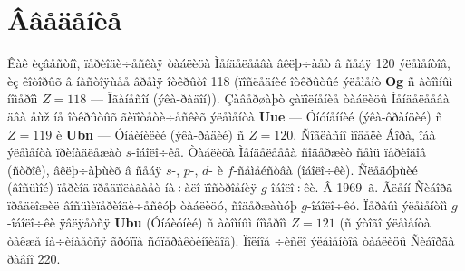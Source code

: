 
\section{Ââåäåíèå}
Êàê èçâåñòíî, ïåðèîäè÷åñêàÿ òàáëèöà Ìåíäåëååâà âêëþ÷àåò â ñåáÿ 120 ýëåìåíòîâ, èç êîòîðûõ â íàñòîÿùåå âðåìÿ îòêðûòî 118 (ïîñëåäíèé îòêðûòûé ýëåìåíò \textbf{Og} ñ àòîìíûì íîìåðîì $Z=118$ --- Îãàíåñîí (ýêà-ðàäîí)). Çàâåðøàþò çàïîëíåíèå òàáëèöû Ìåíäåëååâà äâà åùž íå îòêðûòûõ ãèïîòåòè÷åñêèõ ýëåìåíòà \textbf{Uue} --- Óíóíåííèé (ýêà-ôðàíöèé) ñ $Z=119$ è \textbf{Ubn} --- Óíáèíèëèé (ýêà-ðàäèé) ñ $Z=120$. Ñîãëàñíî ìîäåëè Áîðà, îáà ýëåìåíòà ïðèíàäëåæàò $s$-îáîëî÷êå. Òàáëèöà Ìåíäåëååâà ñîäåðæèò ñåìü ïåðèîäîâ (ñòðîê), âêëþ÷àþùèõ â ñåáÿ $s$-, $p$-, $d$- è $f$-ñåìåéñòâà (îáîëî÷êè). Ñëåäóþùèé (âîñüìîé) ïåðèîä ïðåäïîëàãàåò íà÷àëî ïîñòðîåíèÿ $g$-îáîëî÷êè. Â 1969~ã. Ãëåíí Ñèáîðã \cite{Sea69} ïðåäëîæèë âîñüìèïåðèîäè÷åñêóþ òàáëèöó, ñîäåðæàùóþ $g$-îáîëî÷êó. Ïåðâûì ýëåìåíòîì $g$-îáîëî÷êè ÿâëÿåòñÿ \textbf{Ubu} (Óíáèóíèé) ñ àòîìíûì íîìåðîì $Z=121$ (ñ ýòîãî ýëåìåíòà òàêæå íà÷èíàåòñÿ ãðóïïà ñóïåðàêòèíîèäîâ). Ïîëíîå ÷èñëî ýëåìåíòîâ òàáëèöû Ñèáîðãà ðàâíî 220.

